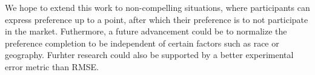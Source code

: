 We hope to extend this work to non-compelling situations, where participants can express preference up to a point, after which their preference is to not participate in the market. Futhermore, a future advancement could be to normalize the preference completion to be independent of certain factors such as race or geography. Furhter research could also be supported by a better experimental error metric than RMSE. 
